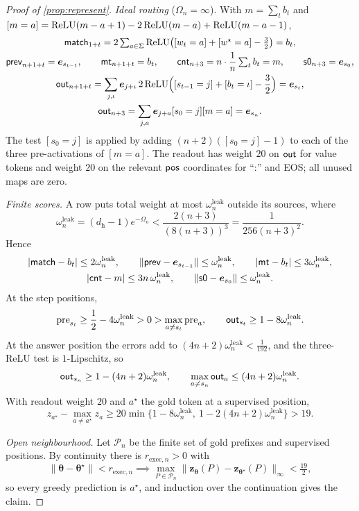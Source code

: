 \begin{proof}[Proof of \cref{prop:represent}]
\emph{Ideal routing} ($\Omega_n=\infty$). With $m=\sum_tb_t$ and $[m=a]=\operatorname{ReLU}(m-a+1)-2\operatorname{ReLU}(m-a)+\operatorname{ReLU}(m-a-1)$,
\begin{gather*}
 \reg{match}_{1+t}=2\textstyle\sum_{a\in\Sigma}\relu\bigl([w_t=a]+[w^\star=a]-\frac{3}{2}\bigr)=b_t,\\
 \reg{prev}_{n+1+t}=\bm e_{s_{t-1}},\qquad \reg{mt}_{n+1+t}=b_t,\qquad
 \reg{cnt}_{n+3}=n\cdot\tfrac{1}{n}\textstyle\sum_tb_t=m,\qquad \reg{s0}_{n+3}=\bm e_{s_0},\\
 \reg{out}_{n+1+t}=\sum_{j,\iota}\bm e_{j+\iota}\,2\relu\Bigl([s_{t-1}=j]+[b_t=\iota]-\frac{3}{2}\Bigr)=\bm e_{s_t},\\
 \reg{out}_{n+3}=\sum_{j,a}\bm e_{j+a}[s_0=j][m=a]=\bm e_{s_n}.
\end{gather*}
The test $[s_0=j]$ is applied by adding $(n+2)([s_0=j]-1)$ to each of the three pre-activations of $[m=a]$. The readout has weight $20$
on $\mathsf{out}$ for value tokens and weight $20$ on the relevant $\mathsf{pos}$ coordinates for ``:'' and EOS; all unused maps are zero.

\emph{Finite scores.} A row puts total weight at most $\omega^{\mathrm{leak}}_n$ outside its sources, where
\[
 \omega^{\mathrm{leak}}_n=(d_{\mathrm h}-1)e^{-\Omega_n}<\frac{2(n+3)}{(8(n+3))^3}=\frac{1}{256(n+3)^2}.
\]
Hence
\begin{gather*}
 |\mathsf{match}-b_t|\le2\omega^{\mathrm{leak}}_n,\qquad \|\mathsf{prev}-\bm e_{s_{t-1}}\|\le\omega^{\mathrm{leak}}_n,\qquad |\mathsf{mt}-b_t|\le3\omega^{\mathrm{leak}}_n,\\
 |\mathsf{cnt}-m|\le3n\,\omega^{\mathrm{leak}}_n,\qquad \|\mathsf{s0}-\bm e_{s_0}\|\le\omega^{\mathrm{leak}}_n .
\end{gather*}
At the step positions,
\[
 \mathrm{pre}_{s_t}\ge\tfrac{1}{2}-4\omega^{\mathrm{leak}}_n>0>\max_{a\ne s_t}\mathrm{pre}_a,\qquad \reg{out}_{s_t}\ge1-8\omega^{\mathrm{leak}}_n .
\]
At the answer position the errors add to $(4n+2)\omega^{\mathrm{leak}}_n<\frac{1}{192}$, and the three-ReLU test is $1$-Lipschitz, so
\[
 \mathsf{out}_{s_n}\ge1-(4n+2)\omega^{\mathrm{leak}}_n,\qquad \max_{a\ne s_n}\mathsf{out}_a\le(4n+2)\omega^{\mathrm{leak}}_n .
\]
With readout weight $20$ and $a^\star$ the gold token at a supervised position,
\[
 z_{a^\star}-\max_{a\ne a^\star}z_a\ge20\min\bigl\{1-8\omega^{\mathrm{leak}}_n,\ 1-2(4n+2)\omega^{\mathrm{leak}}_n\bigr\}>19 .
\]

\emph{Open neighbourhood.} Let $\mathcal P_n$ be the finite set of gold prefixes and supervised positions. By continuity there is
$r_{\mathrm{exec},n}>0$ with
\[
 \|\bm\theta-\bm\theta^\star\|<r_{\mathrm{exec},n}\implies\max_{P\in\mathcal P_n}\|\bm z_{\bm\theta}(P)-\bm z_{\bm\theta^\star}(P)\|_\infty<\tfrac{19}{2},
\]
so every greedy prediction is $a^\star$, and induction over the continuation gives the claim.
\end{proof}


